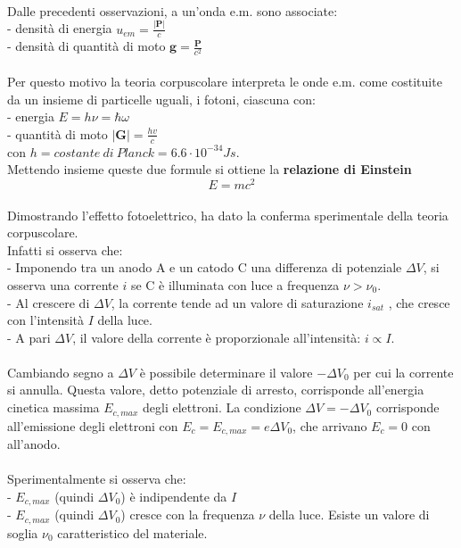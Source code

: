 \documentclass{article}
\begin{document}
\\
Dalle precedenti osservazioni, a un’onda e.m. sono associate:\\
- densità di energia $u_{em}=\frac{|\textbf{P}|}{c}$\\
- densità di quantità di moto $\textbf{g}=\frac{\textbf{P}}{c^2}$\\
\\
Per questo motivo la teoria corpuscolare interpreta le onde e.m. come costituite da un insieme di particelle uguali, i fotoni, ciascuna con:\\
- energia $E=h \nu =$\(\hbar\)$\omega$\\
- quantità di moto $|\textbf{G}|=\frac{hv}{c}$\\
con $h= costante\ di\ Planck=6.6\cdot10^{-34}Js$.\\
Mettendo insieme queste due formule si ottiene la \textbf{relazione di Einstein}
\begin{equation}
    E=mc^2
    \nonumber
\end{equation}
\\
Dimostrando l’effetto fotoelettrico, ha dato la conferma sperimentale della teoria corpuscolare.\\
Infatti si osserva che:\\
- Imponendo tra un anodo A e un catodo C una differenza di potenziale $\Delta V$, si osserva una corrente $i$ se C è illuminata con luce a frequenza $\nu > \nu_0$.\\
- Al crescere di $\Delta V$, la corrente tende ad un valore di saturazione $i_{sat}$ , che cresce con l’intensità $I$ della luce.\\
- A pari $\Delta V$, il valore della corrente è proporzionale all’intensità: $i \propto I$.\\
\\
Cambiando segno a $\Delta V$ è possibile determinare il valore $-\Delta V_0$ per cui la corrente si annulla. Questa valore, detto potenziale di arresto, corrisponde all’energia cinetica massima $E_{c,max}$ degli elettroni. La condizione $\Delta V=-\Delta V_0$ corrisponde all’emissione degli elettroni con $E_c=E_{c,max}=e\Delta V_0$, che arrivano $E_c=0$ con all’anodo.\\
\\
Sperimentalmente si osserva che:\\
- $E_{c,max}$ (quindi $\Delta V_0$) è indipendente da $I$\\
- $E_{c,max}$ (quindi $\Delta V_0$) cresce con la frequenza $\nu$ della luce. Esiste un valore di soglia $\nu_0$ caratteristico del materiale.\\
\end{document}
